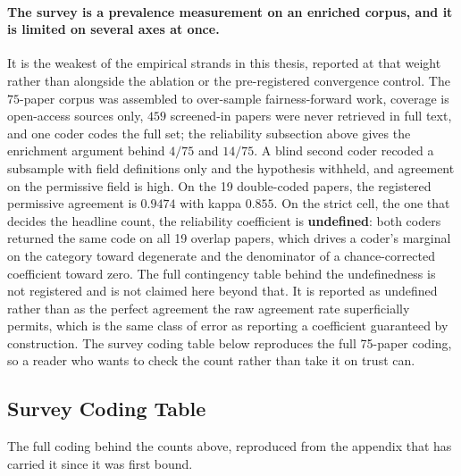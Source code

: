 \paragraph{The survey is a prevalence measurement on an enriched corpus, and it
is limited on several axes at once.} It is the weakest of the empirical
strands in this thesis, reported at that weight rather than alongside the
ablation or the pre-registered convergence control. The $75$-paper corpus was
assembled to over-sample fairness-forward work, coverage is open-access
sources only, $459$ screened-in papers were never retrieved in full text, and
one coder codes the full set; the reliability subsection above gives the
enrichment argument behind $4/75$ and $14/75$. A blind second coder recoded a
subsample with field definitions only and the hypothesis withheld, and
agreement on the permissive field is high. On the 19 double-coded papers, the
registered permissive
agreement is $0.9474$ with kappa $0.855$. On the strict cell, the one that decides the
headline count, the reliability coefficient is
\textbf{undefined}: both coders returned the same code on all 19 overlap
papers, which drives a coder's marginal on the category toward degenerate and
the denominator of a chance-corrected coefficient toward zero. The full
contingency table behind the undefinedness is not registered and is not
claimed here beyond that. It is reported as undefined rather than as the
perfect agreement the raw agreement rate superficially permits, which is the
same class of error as reporting a coefficient guaranteed by construction.
The survey coding table below reproduces the full 75-paper coding, so a
reader who wants to check the count rather than take it on trust can.


\subsection{Survey Coding Table}

The full coding behind the counts above, reproduced from the appendix that
has carried it since it was first bound.

\begingroup
\renewcommand{\chapter}[1]{}

\endgroup

